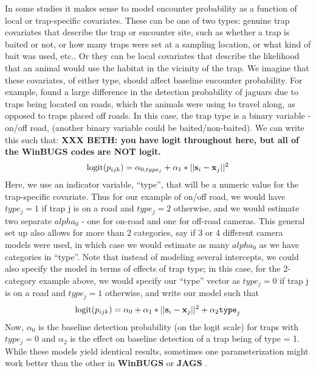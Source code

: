 In some studies it makes sense to model encounter probability as a
function of local or trap-specific covariates. These can be one of two
types: genuine trap covariates that describe the trap or encounter site,
such as whether a trap is baited or not, or how many traps were set at a sampling location,
or what kind of bait was used, etc.. Or they can be local covariates that
describe the likelihood that an animal would use the habitat in the
vicinity of the trap.
We imagine that these covariates, of either type, should affect
baseline encounter probability.
For example, \citet{sollmann_etal:2011}
found a large difference in the detection probability of jaguars due to traps
being located on roads, which the animals were using to travel along, as
opposed to traps placed off roads.  In this case, the trap
type is a binary variable - on/off road,
(another binary variable could be baited/non-baited).  We can write this such that:
{\bf 
XXX BETH: you have logit throughout here, but all of the WinBUGS codes
are NOT logit.
}
\[
\mbox{logit}(p_{ijk}) = \alpha_{0,type_j} + \alpha_1*||{\bf s}_{i}-{\bf x}_{j}||^{2}
\]
Here, we use an indicator variable, ``type'', that will be a numeric
value for the trap-specific covariate.  Thus for our example of on/off
road, we would have $type_j = 1$ if trap j is on a road and $type_j
= 2$ otherwise, and we would estimate two separate $alpha_{0}$ - one for on-road and one for off-road cameras.  This general set up also allows for more than 2 categories,
say if 3 or 4 different camera models were used, in which case we would estimate as many $alpha_{0}$ as we have categories in ``type''. Note that instead of modeling several intercepts, we could also specify the model in terms of effects of trap type; in this case, for the 2-category example above, we would specify our ``type'' vector as $type_j = 0$ if trap j is on a road and $type_j
= 1$ otherwise, and write our model such that
\[
\mbox{logit}(p_{ijk}) = \alpha_{0} + \alpha_1*||{\bf s}_{i}-{\bf x}_{j}||^{2}
+ \alpha_{2} \mbox{\tt type}_{j}
\]
Now, $\alpha_{0}$ is the baseline detection probability (on the logit scale) for traps with $type_j = 0$ and $\alpha_{2}$ is the effect on baseline detection of a trap being of type = 1. While these models yield identical results, sometimes one parameterization might work better than the other in {\bf WinBUGS} or {\bf JAGS} \citep{kery:2010}.
 

